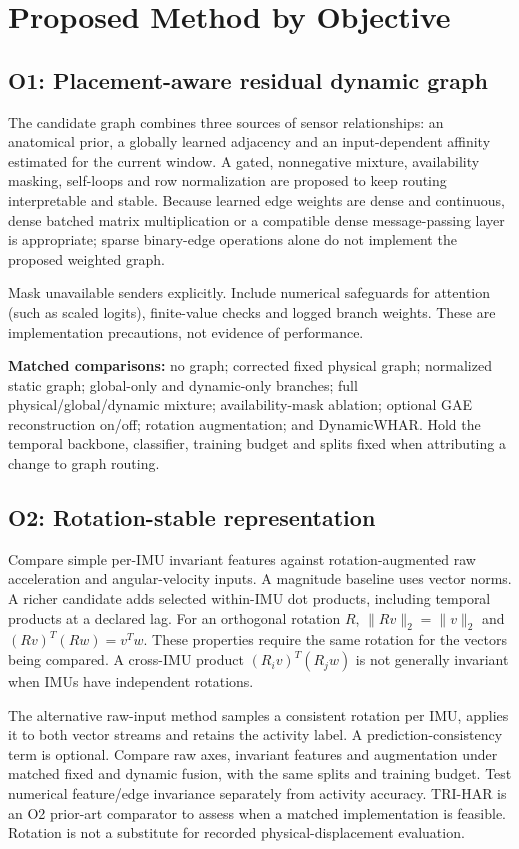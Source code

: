 \documentclass[10pt,a4paper]{article}
\begin{document}
\section{Proposed Method by Objective}
\subsection{O1: Placement-aware residual dynamic graph}
The candidate graph combines three sources of sensor relationships: an anatomical prior, a globally learned adjacency and an input-dependent affinity estimated for the current window. A gated, nonnegative mixture, availability masking, self-loops and row normalization are proposed to keep routing interpretable and stable. Because learned edge weights are dense and continuous, dense batched matrix multiplication or a compatible dense message-passing layer is appropriate; sparse binary-edge operations alone do not implement the proposed weighted graph.

Mask unavailable senders explicitly. Include numerical safeguards for attention (such as scaled logits), finite-value checks and logged branch weights. These are implementation precautions, not evidence of performance.

\textbf{Matched comparisons:} no graph; corrected fixed physical graph; normalized static graph; global-only and dynamic-only branches; full physical/global/dynamic mixture; availability-mask ablation; optional GAE reconstruction on/off; rotation augmentation; and DynamicWHAR. Hold the temporal backbone, classifier, training budget and splits fixed when attributing a change to graph routing.

\subsection{O2: Rotation-stable representation}
Compare simple per-IMU invariant features against rotation-augmented raw acceleration and angular-velocity inputs. A magnitude baseline uses vector norms. A richer candidate adds selected within-IMU dot products, including temporal products at a declared lag. For an orthogonal rotation $R$, $\|Rv\|_2=\|v\|_2$ and $(Rv)^T(Rw)=v^Tw$. These properties require the same rotation for the vectors being compared. A cross-IMU product $(R_i v)^T(R_j w)$ is not generally invariant when IMUs have independent rotations.

The alternative raw-input method samples a consistent rotation per IMU, applies it to both vector streams and retains the activity label. A prediction-consistency term is optional. Compare raw axes, invariant features and augmentation under matched fixed and dynamic fusion, with the same splits and training budget. Test numerical feature/edge invariance separately from activity accuracy. TRI-HAR is an O2 prior-art comparator to assess when a matched implementation is feasible. Rotation is not a substitute for recorded physical-displacement evaluation.
\end{document}
